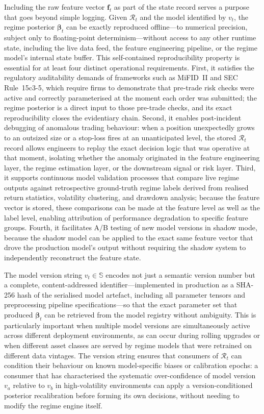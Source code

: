 \documentclass[12pt,openany]{book}
\numberwithin{equation}{chapter}
\theoremstyle{plain}
\theoremstyle{definition}
\theoremstyle{remark}
\begin{document}
Including the raw feature vector $\mathbf{f}_t$ as part of the state record serves a purpose that goes beyond simple logging. Given $\mathcal{R}_t$ and the model identified by $v_t$, the regime posterior $\boldsymbol{\beta}_t$ can be exactly reproduced offline---to numerical precision, subject only to floating-point determinism---without access to any other runtime state, including the live data feed, the feature engineering pipeline, or the regime model's internal state buffer. This self-contained reproducibility property is essential for at least four distinct operational requirements. First, it satisfies the regulatory auditability demands of frameworks such as MiFID~II and SEC Rule~15c3-5, which require firms to demonstrate that pre-trade risk checks were active and correctly parameterised at the moment each order was submitted; the regime posterior is a direct input to those pre-trade checks, and its exact reproducibility closes the evidentiary chain. Second, it enables post-incident debugging of anomalous trading behaviour: when a position unexpectedly grows to an outsized size or a stop-loss fires at an unanticipated level, the stored $\mathcal{R}_t$ record allows engineers to replay the exact decision logic that was operative at that moment, isolating whether the anomaly originated in the feature engineering layer, the regime estimation layer, or the downstream signal or risk layer. Third, it supports continuous model validation processes that compare live regime outputs against retrospective ground-truth regime labels derived from realised return statistics, volatility clustering, and drawdown analysis; because the feature vector is stored, these comparisons can be made at the feature level as well as the label level, enabling attribution of performance degradation to specific feature groups. Fourth, it facilitates A/B testing of new model versions in shadow mode, because the shadow model can be applied to the exact same feature vector that drove the production model's output without requiring the shadow system to independently reconstruct the feature state.

The model version string $v_t \in \mathbb{S}$ encodes not just a semantic version number but a complete, content-addressed identifier---implemented in production as a SHA-256 hash of the serialised model artefact, including all parameter tensors and preprocessing pipeline specifications---so that the exact parameter set that produced $\boldsymbol{\beta}_t$ can be retrieved from the model registry without ambiguity. This is particularly important when multiple model versions are simultaneously active across different deployment environments, as can occur during rolling upgrades or when different asset classes are served by regime models that were retrained on different data vintages. The version string ensures that consumers of $\mathcal{R}_t$ can condition their behaviour on known model-specific biases or calibration epochs: a consumer that has characterised the systematic over-confidence of model version $v_a$ relative to $v_b$ in high-volatility environments can apply a version-conditioned posterior recalibration before forming its own decisions, without needing to modify the regime engine itself.
\end{document}
